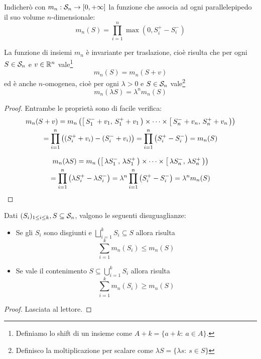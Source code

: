 \begin{definition}\label{def:LebesgueElementare}
	Indicherò con $m_n:\S_n\to\Rpiu$ la funzione che associa ad ogni parallelepipedo il suo volume $n$-dimensionale:
	\begin{equation*}
		m_n(S)=\prod_{i=1}^n\max(0,S^+_i-S^-_i)
	\end{equation*}
\end{definition}
\begin{remark}\label{nota:LebesgueElementareProprieta}
	La funzione di insiemi $m_n$ è invariante per traslazione, cioè risulta che per ogni $S\in\S_n$ e $v\in\R^n$ vale\footnote{Definiamo lo shift di un insieme come $A+k=\{a+k:\ a\in A\}$.}
	\begin{equation*}
		m_n(S)=m_n(S+v)
	\end{equation*}
	ed è anche $n$-omogenea, cioè per ogni $\lambda>0$ e $S\in\S_n$ vale\footnote{Definisco la moltiplicazione per scalare come $\lambda S=\{\lambda s:\ s\in S\}$}
	\begin{equation*}
		m_n(\lambda S)=\lambda^n m_n(S)
	\end{equation*}
\end{remark}
\begin{proof}
	Entrambe le proprietà sono di facile verifica:
	\begin{multline*}
		m_n(S+v)=m_n\left(\co{S^-_1+v_1}{S^+_1+v_1}\times\cdots\times\co{S^-_n+v_n}{S^+_n+v_n}\right)\\
		=\prod_{i=1}^n\left((S^+_i+v_i)-(S^-_i+v_i)\right)=\prod_{i=1}^n\left(S^+_i-S^-_i\right)=m_n(S)
	\end{multline*}
	
	\begin{multline*}
		m_n(\lambda S)=m_n\left(\co{\lambda S^-_1}{\lambda S^+_1}\times\cdots\times\co{\lambda S^-_n}{\lambda S^+_n}\right)\\
		=\prod_{i=1}^n\left(\lambda S^+_i-\lambda S^-_i\right)=\lambda^n\prod_{i=1}^n\left(S^+_i-S^-_i\right)=\lambda^n m_n(S)
	\end{multline*}
\end{proof}


\begin{lemma}\label{lem:LebesgueElementareFinita}
	Dati $(S_i)_{1\le i\le k},S\subseteq \S_n$, valgono le seguenti disuguaglianze:
	\begin{itemize}
		\item Se gli $S_i$ sono disgiunti e $\bigsqcup_{i=1}^k S_i\subseteq S$ allora risulta
		\begin{equation*}
			\sum_{i=1}^k m_n(S_i)\le m_n(S)
		\end{equation*}
		\item Se vale il contenimento $S\subseteq\bigcup_{i=1}^k S_i$ allora risulta
		\begin{equation*}
			\sum_{i=1}^k m_n(S_i)\ge m_n(S)
		\end{equation*}
	\end{itemize}
\end{lemma}
\begin{proof}
	Lasciata al lettore.
\end{proof}

